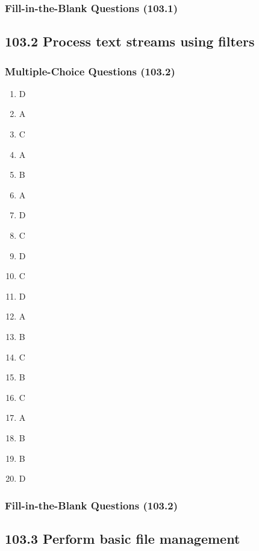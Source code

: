 \documentclass[a4paper]{report}
\begin{document}
\subsubsection*{Fill-in-the-Blank Questions (103.1)}

\subsection*{103.2 Process text streams using filters}
\subsubsection*{Multiple-Choice Questions (103.2)}

\begin{enumerate}[1.]
    \item D
    \item A
    \item C
    \item A
    \item B
    \item A
    \item D
    \item C
    \item D
    \item C
    \item D
    \item A
    \item B
    \item C
    \item B
    \item C
    \item A
    \item B
    \item B
    \item D
\end{enumerate}


\subsubsection*{Fill-in-the-Blank Questions (103.2)}
\subsection*{103.3 Perform basic file management}
\end{document}
